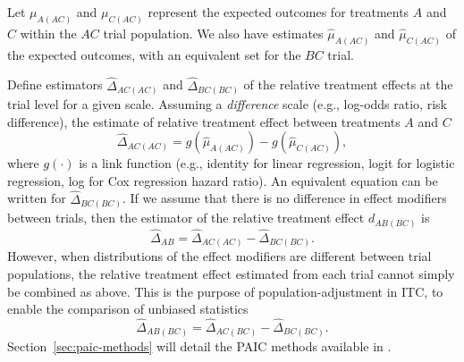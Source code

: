 \documentclass[article]{jss}
\begin{document}
Let $\mu_{A(AC)}$ and $\mu_{C(AC)}$ represent the expected outcomes for treatments $A$ and $C$ within the $AC$ trial population. We also have estimates $\hat{\mu}_{A(AC)}$ and $\hat{\mu}_{C(AC)}$ of the expected outcomes, with an equivalent set for the $BC$ trial. 

Define estimators $\hat{\Delta}_{AC(AC)}$ and $\hat{\Delta}_{BC(BC)}$ of the relative treatment effects at the trial level for a given scale. Assuming a {\it difference} scale (e.g., log-odds ratio, risk difference), the estimate of relative treatment effect between treatments $A$ and $C$
\begin{equation}
\label{eqn:relative_treatment_effect}
\hat{\Delta}_{AC(AC)} = g(\hat{\mu}_{A{(AC)}}) - g(\hat{\mu}_{C{(AC)}}),
\end{equation}
where $g(\cdot)$ is a link function (e.g., identity for linear regression, logit for logistic regression, log for Cox regression hazard ratio). An equivalent equation can be written for $\hat{\Delta}_{BC(BC)}$. If we assume that there is no difference in effect modifiers between trials, then the estimator of the relative treatment effect $d_{AB(BC)}$ is
\[
\hat{\Delta}_{AB} = \hat{\Delta}_{AC(AC)} - \hat{\Delta}_{BC(BC)}.
\]
However, when distributions of the effect modifiers are different between trial populations, the relative treatment effect estimated from each trial cannot simply be combined as above. This is the purpose of population-adjustment in ITC, to enable the comparison of unbiased statistics
\begin{equation}
\label{eqn:paic}
\hat{\Delta}_{AB(BC)} = \hat{\Delta}_{AC(BC)} - \hat{\Delta}_{BC(BC)}.
\end{equation}
Section~\ref{sec:paic-methods} will detail the PAIC methods available in .

\end{document}

